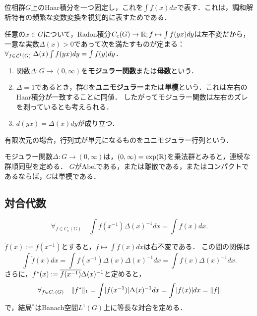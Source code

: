 \documentclass[uplatex,dvipdfmx]{jsreport}
\begin{document}
\begin{notation}
    位相群$G$上のHaar積分を一つ固定し，これを$\int f(x)dx$で表す．これは，調和解析特有の頻繁な変数変換を視覚的に表すためである．
\end{notation}

\begin{definition}
    任意の$x\in G$について，Radon積分$C_c(G)\to\mathbb{R};f\mapsto\int f(yx)dy$は左不変だから，一意な実数$\Delta(x)>0$であって次を満たすものが定まる：$\forall_{f\in\mathcal{L}^1(G)}\;\Delta(x)\int f(yx)dy=\int f(y)dy$．
    \begin{enumerate}
        \item 関数$\Delta:G\to(0,\infty)$を\textbf{モジュラー関数}または\textbf{母数}という．
        \item $\Delta=1$であるとき，群$G$を\textbf{ユニモジュラー}または\textbf{単模}という．これは左右のHaar積分が一致することに同値．
    したがってモジュラー関数は左右のズレを測っているとも考えられる．
    \item $d(yx)=\Delta(x)dy$が成り立つ．
    \end{enumerate}
\end{definition}
\begin{remark}
    有限次元の場合，行列式が単元になるものをユニモジュラー行列という．
\end{remark}

\begin{proposition}
    モジュラー関数$\Delta:G\to(0,\infty)$は，$(0,\infty)=\exp(\mathbb{R})$を乗法群とみると，連続な群順同型を定める．
    $G$がAbelである，または離散である，またはコンパクトであるならば，$G$は単模である．
\end{proposition}

\subsection{対合代数}

\begin{lemma}
    \[\forall_{f\in C_c(G)}\quad\int f(x^{-1})\Delta(x)^{-1}dx=\int f(x)dx.\]
\end{lemma}

\begin{discussion}
    $\check{f}(x):=f(x^{-1})$とすると，$f\mapsto\int\check{f}(x)dx$は右不変である．
    この間の関係は
    \[\int\check{f}(x)dx=\int f(x^{-1})\Delta(x)\Delta(x)^{-1}dx=\int f(x)\Delta(x)^{-1}dx.\]
    さらに，$f^*(x):=\overline{f(x^{-1})}\Delta(x)^{-1}$と定めると，
    \[\forall_{f\in C_c(G)}\quad\|f^*\|_1=\int\lvert f(x^{-1})\rvert\Delta(x)^{-1}dx=\int\lvert f(x)\rvert dx=\|f\|\]
    で，結局${}^*$はBanach空間$L^1(G)$上に等長な対合を定める．
\end{discussion}
\end{document}
